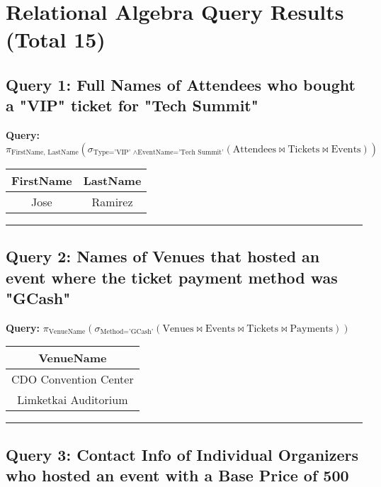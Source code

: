 \documentclass{article}
\begin{document}
\section*{Relational Algebra Query Results (Total 15)}

\subsection*{Query 1: Full Names of Attendees who bought a "VIP" ticket for "Tech Summit"}

\noindent \textbf{Query:} $\pi_{\text{FirstName, LastName}} \left( \sigma_{\text{Type='VIP' } \land \text{EventName='Tech Summit'}} \left( \text{Attendees} \bowtie \text{Tickets} \bowtie \text{Events} \right) \right)$

\begin{center}
\begin{tabular}{cc}
\toprule
\textbf{FirstName} & \textbf{LastName} \\
\midrule
Jose & Ramirez \\
\bottomrule
\end{tabular}
\end{center}

\hrule

\subsection*{Query 2: Names of Venues that hosted an event where the ticket payment method was "GCash"}

\noindent \textbf{Query:} $\pi_{\text{VenueName}} \left( \sigma_{\text{Method='GCash'}} \left( \text{Venues} \bowtie \text{Events} \bowtie \text{Tickets} \bowtie \text{Payments} \right) \right)$

\begin{center}
\begin{tabular}{c}
\toprule
\textbf{VenueName} \\
\midrule
CDO Convention Center \\
Limketkai Auditorium \\
\bottomrule
\end{tabular}
\end{center}

\hrule

\subsection*{Query 3: Contact Info of Individual Organizers who hosted an event with a Base Price of 500}
\end{document}
